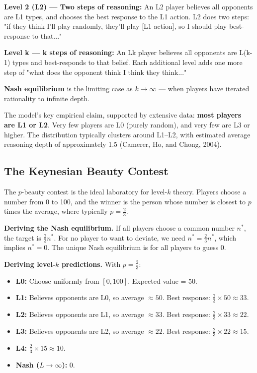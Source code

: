 \documentclass[12pt, letterpaper]{article}
\begin{document}
\textbf{Level 2 (L2) --- Two steps of reasoning:} An L2 player believes all opponents are L1 types, and chooses the best response to the L1 action. L2 does two steps: "if they think I'll play randomly, they'll play [L1 action], so I should play best-response to that..."

\textbf{Level k --- k steps of reasoning:} An Lk player believes all opponents are L(k-1) types and best-responds to that belief. Each additional level adds one more step of "what does the opponent think I think they think..."

\textbf{Nash equilibrium} is the limiting case as $k \to \infty$ --- when players have iterated rationality to infinite depth.

The model's key empirical claim, supported by extensive data: \textbf{most players are L1 or L2}. Very few players are L0 (purely random), and very few are L3 or higher. The distribution typically clusters around L1--L2, with estimated average reasoning depth of approximately 1.5 (Camerer, Ho, and Chong, 2004).


\subsection{The Keynesian Beauty Contest}


The $p$-beauty contest is the ideal laboratory for level-$k$ theory. Players choose a number from 0 to 100, and the winner is the person whose number is closest to $p$ times the average, where typically $p = \frac{2}{3}$.

\textbf{Deriving the Nash equilibrium.} If all players choose a common number $n^*$, the target is $\frac{2}{3} n^*$. For no player to want to deviate, we need $n^* = \frac{2}{3} n^*$, which implies $n^* = 0$. The unique Nash equilibrium is for all players to guess 0.

\textbf{Deriving level-$k$ predictions.} With $p = \frac{2}{3}$:

\begin{itemize}
\item \textbf{L0:} Choose uniformly from $[0,100]$. Expected value = 50.
\item \textbf{L1:} Believes opponents are L0, so average $\approx 50$. Best response: $\frac{2}{3} \times 50 \approx 33$.
\item \textbf{L2:} Believes opponents are L1, so average $\approx 33$. Best response: $\frac{2}{3} \times 33 \approx 22$.
\item \textbf{L3:} Believes opponents are L2, so average $\approx 22$. Best response: $\frac{2}{3} \times 22 \approx 15$.
\item \textbf{L4:} $\frac{2}{3} \times 15 \approx 10$.
\item \textbf{Nash ($L \to \infty$):} 0.
\end{itemize}
\end{document}
